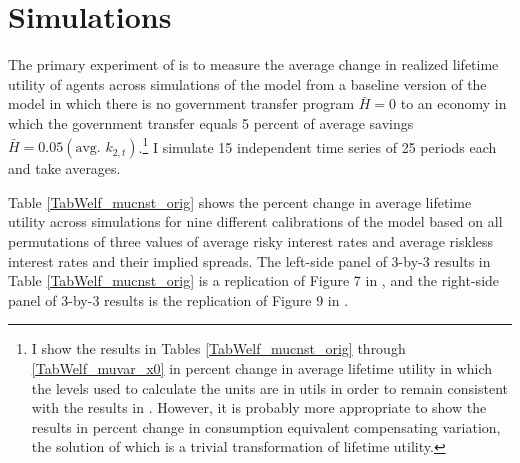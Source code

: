\documentclass[letterpaper,12pt]{article}
\theoremstyle{definition}
\begin{document}
\section{Simulations}\label{SecSims}

  The primary experiment of \citet{Blanchard:2019} is to measure the average change in realized lifetime utility of agents across simulations of the model from a baseline version of the model in which there is no government transfer program $\bar{H}=0$ to an economy in which the government transfer equals 5 percent of average savings $\bar{H}=0.05(\text{avg. }k_{2,t})$.\footnote{I show the results in Tables \ref{TabWelf_mucnst_orig} through \ref{TabWelf_muvar_x0} in percent change in average lifetime utility in which the levels used to calculate the units are in utils in order to remain consistent with the results in \citet{Blanchard:2019}. However, it is probably more appropriate to show the results in percent change in consumption equivalent compensating variation, the solution of which is a trivial transformation of lifetime utility.} I simulate 15 independent time series of 25 periods each and take averages.

  Table \ref{TabWelf_mucnst_orig} shows the percent change in average lifetime utility across simulations for nine different calibrations of the model based on all permutations of three values of average risky interest rates and average riskless interest rates and their implied spreads. The left-side panel of 3-by-3 results in Table \ref{TabWelf_mucnst_orig} is a replication of Figure 7 in \citet{Blanchard:2019}, and the right-side panel of 3-by-3 results is the replication of Figure 9 in \citet{Blanchard:2019}.
\end{document}
